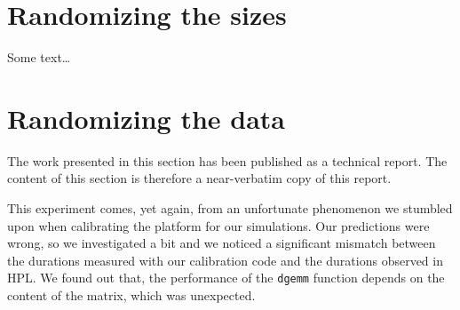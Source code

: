     \section{Randomizing the sizes}%
    \label{sec:randomizing_sizes}
        Some text\dots

    \section{Randomizing the data}%
    \label{sec:randomizing_data}
        The work presented in this section has been published as a technical report\cite{cornebize:bitflips}. The
        content of this section is therefore a near-verbatim copy of this report.

        This experiment comes, yet again, from an unfortunate phenomenon we stumbled upon when calibrating the platform
        for our simulations. Our predictions were wrong, so we investigated a bit and we noticed a significant mismatch
        between the durations measured with our calibration code and the durations observed in HPL. We found out that,
        the performance of the \texttt{dgemm} function depends on the content of the matrix, which was unexpected.

